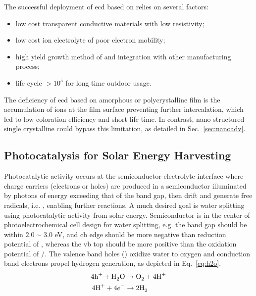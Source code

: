 The successful deployment of \gls{ecd} based on  relies on several factors:\cite{Granqvist2000}
\begin{itemize}
\item low cost transparent conductive materials with low resistivity;
\item low cost ion electrolyte of poor electron mobility;
\item high yield growth method of  and integration with other manufacturing process; 
\item life cycle $> 10^5$ for long time outdoor usage.
\end{itemize}
The deficiency of \gls{ecd} based on amorphous or polycrystalline  film is the accumulation of ions at the film surface preventing further intercalation,\cite{Dini1996} which led to low coloration efficiency and short life time. In contrast, nano-structured single crystalline  could bypass this limitation, as detailed in Sec.~\ref{sec:nanoadv}.

\subsection{Photocatalysis for Solar Energy Harvesting}

Photocatalytic activity occurs at the semiconductor-electrolyte interface where charge carriers (electrons or holes) are produced in a semiconductor illuminated by photons of energy exceeding that of the band gap, then drift and generate free radicals, i.e. , enabling further reactions. A much desired goal is water splitting using photocatalytic activity from solar energy. Semiconductor is in the center of photoelectrochemical cell design for water splitting, e.g. the band gap should be within $2.0 \sim 3.0 $ eV, and \gls{cb} edge should be more negative than reduction potential of , whereas the \gls{vb} top should be more positive than the oxidation potential of /.\cite{Osterloh2008,Wang2012} The valence band holes () oxidize water to oxygen and conduction band electrons propel hydrogen generation, as depicted in Eq.~\ref{eq:h2o}.
\begin{subequations}\label{eq:h2o}
\begin{align}
4\ce{h^+} +  \ce{H2O} &\rightarrow \ce{O2} + 4\ce{H^+} \label{eq:hervb}\\
4\ce{H^+} +  4e^- &\rightarrow 2\ce{H2} \label{eq:hercb}
\end{align}
\end{subequations}

